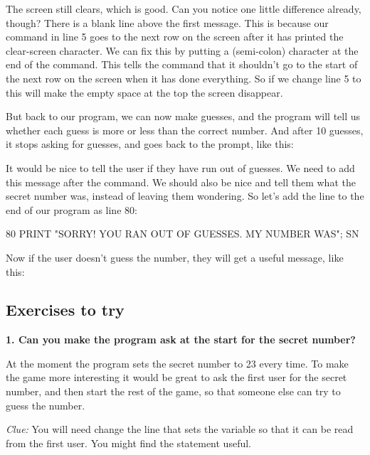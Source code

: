 
The screen still clears, which is good.  Can you notice one little
difference already, though?  There is a blank line above the first
message. This is because our  command in line 5 goes to
the next row on the screen after it has printed the clear-screen character.  We can
fix this by putting a \stw{;} (semi-colon) character at the end of the
 command.  This tells the  command that it
shouldn't go to the start of the next row on the screen when it has
done everything.  So if we change line 5 to  this
will make the empty space at the top the screen disappear.

\needspace{4cm}
But back to our program, we can now make guesses, and the program
will tell us whether each guess is more or less than the correct
number.  And after 10 guesses, it stops asking for guesses, and goes
back to the  prompt, like this:


\needspace{2cm}
It would be nice to tell the user if they have run out of
guesses. We need to add this message after the  command.
We should also be nice and tell them what the secret number was,
instead of leaving them wondering.
So let's add the line to the end of our program as line 80:

\begin{screencode}
80 PRINT "SORRY! YOU RAN OUT OF GUESSES. MY NUMBER WAS"; SN
\end{screencode}

\needspace{4cm}
Now if the user doesn't guess the number, they will get a useful
message, like this:


\subsection{Exercises to try}

{\bf 1. Can you make the program ask at the start for the secret number?}

At the moment the program sets the secret number to 23 every
time. To make the game more interesting it would be great to ask the
first user for the secret number, and then start the rest of the game,
so that someone else can try to guess the number.

{\em Clue:} You will need change the line that sets the  variable
so that it can be read from the first user. You might find the
 statement useful.

